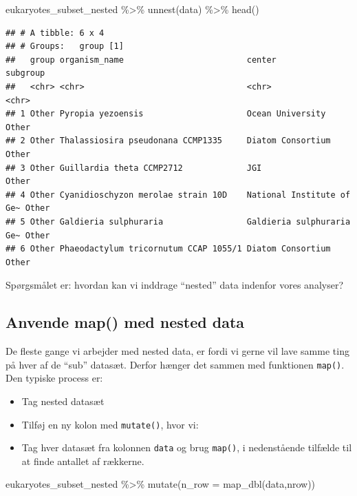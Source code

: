 \documentclass[
]{book}
\newenvironment{Shaded}{\begin{snugshade}}{\end{snugshade}}
\newcommand{\AttributeTok}[1]{\textcolor[rgb]{0.77,0.63,0.00}{#1}}
\newcommand{\FunctionTok}[1]{\textcolor[rgb]{0.00,0.00,0.00}{#1}}
\newcommand{\NormalTok}[1]{#1}
\newcommand{\SpecialCharTok}[1]{\textcolor[rgb]{0.00,0.00,0.00}{#1}}
\providecommand{\tightlist}{%
  \setlength{\itemsep}{0pt}\setlength{\parskip}{0pt}}
\begin{document}
\begin{Shaded}
\begin{Highlighting}[]
\NormalTok{eukaryotes\_subset\_nested }\SpecialCharTok{\%\textgreater{}\%} 
  \FunctionTok{unnest}\NormalTok{(data) }\SpecialCharTok{\%\textgreater{}\%} 
  \FunctionTok{head}\NormalTok{()}
\end{Highlighting}
\end{Shaded}

\begin{verbatim}
## # A tibble: 6 x 4
## # Groups:   group [1]
##   group organism_name                         center                    subgroup
##   <chr> <chr>                                 <chr>                     <chr>   
## 1 Other Pyropia yezoensis                     Ocean University          Other   
## 2 Other Thalassiosira pseudonana CCMP1335     Diatom Consortium         Other   
## 3 Other Guillardia theta CCMP2712             JGI                       Other   
## 4 Other Cyanidioschyzon merolae strain 10D    National Institute of Ge~ Other   
## 5 Other Galdieria sulphuraria                 Galdieria sulphuraria Ge~ Other   
## 6 Other Phaeodactylum tricornutum CCAP 1055/1 Diatom Consortium         Other
\end{verbatim}

Spørgsmålet er: hvordan kan vi inddrage ``nested'' data indenfor vores analyser?

\hypertarget{anvende-map-med-nested-data}{%
\subsection{Anvende map() med nested data}\label{anvende-map-med-nested-data}}

De fleste gange vi arbejder med nested data, er fordi vi gerne vil lave samme ting på hver af de ``sub'' datasæt. Derfor hænger det sammen med funktionen \texttt{map()}. Den typiske process er:

\begin{itemize}
\tightlist
\item
  Tag nested datasæt
\item
  Tilføj en ny kolon med \texttt{mutate()}, hvor vi:
\item
  Tag hver datasæt fra kolonnen \texttt{data} og brug \texttt{map()}, i nedenstående tilfælde til at finde antallet af rækkerne.
\end{itemize}

\begin{Shaded}
\begin{Highlighting}[]
\NormalTok{eukaryotes\_subset\_nested }\SpecialCharTok{\%\textgreater{}\%} 
  \FunctionTok{mutate}\NormalTok{(}\AttributeTok{n\_row =} \FunctionTok{map\_dbl}\NormalTok{(data,nrow))}
\end{Highlighting}
\end{Shaded}
\end{document}
